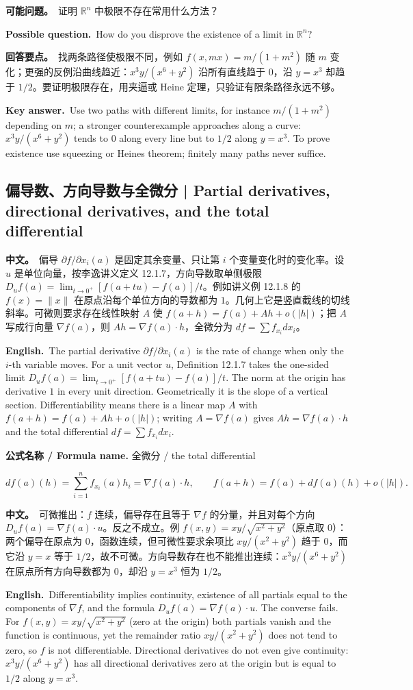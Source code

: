 \documentclass[UTF8,11pt,a4paper]{ctexart}
\newcommand{\BOTH}[2]{\par\noindent\textbf{中文。}\ #1\par\noindent\textbf{English.}\ #2\par}
\newcommand{\FORMULA}[2]{\par\noindent\textbf{公式名称 / Formula name.} #1 / #2\par}
\newcommand{\ASK}[4]{\begin{samepage}\par\noindent\textbf{可能问题。}\ #1\par\noindent\textbf{Possible question.}\ #2\par\noindent\textbf{回答要点。}\ #3\par\noindent\textbf{Key answer.}\ #4\medskip\end{samepage}}
\begin{document}
\ASK{证明 $\mathbb R^n$ 中极限不存在常用什么方法？}{How do you disprove the existence of a limit in $\mathbb R^n$?}{找两条路径使极限不同，例如 $f(x,mx)=m/(1+m^2)$ 随 $m$ 变化；更强的反例沿曲线趋近：$x^3y/(x^6+y^2)$ 沿所有直线趋于 $0$，沿 $y=x^3$ 却趋于 $1/2$。要证明极限存在，用夹逼或 Heine 定理，只验证有限条路径永远不够。}{Use two paths with different limits, for instance $m/(1+m^2)$ depending on $m$; a stronger counterexample approaches along a curve: $x^3y/(x^6+y^2)$ tends to $0$ along every line but to $1/2$ along $y=x^3$. To prove existence use squeezing or Heine\textquotesingle s theorem; finitely many paths never suffice.}

\subsection{偏导数、方向导数与全微分 | Partial derivatives, directional derivatives, and the total differential}
\BOTH{偏导 $\partial f/\partial x_i(a)$ 是固定其余变量、只让第 $i$ 个变量变化时的变化率。设 $u$ 是单位向量，按李逸讲义定义 12.1.7，方向导数取单侧极限 $D_uf(a)=\lim_{t\to0^+}[f(a+tu)-f(a)]/t$。例如讲义例 12.1.8 的 $f(x)=\|x\|$ 在原点沿每个单位方向的导数都为 $1$。几何上它是竖直截线的切线斜率。可微则要求存在线性映射 $A$ 使 $f(a+h)=f(a)+Ah+o(|h|)$；把 $A$ 写成行向量 $\nabla f(a)$，则 $Ah=\nabla f(a)\cdot h$，全微分为 $df=\sum f_{x_i}dx_i$。}{The partial derivative $\partial f/\partial x_i(a)$ is the rate of change when only the $i$-th variable moves. For a unit vector $u$, Definition 12.1.7 takes the one-sided limit $D_uf(a)=\lim_{t\to0^+}[f(a+tu)-f(a)]/t$. The norm at the origin has derivative $1$ in every unit direction. Geometrically it is the slope of a vertical section. Differentiability means there is a linear map $A$ with $f(a+h)=f(a)+Ah+o(|h|)$; writing $A=\nabla f(a)$ gives $Ah=\nabla f(a)\cdot h$ and the total differential $df=\sum f_{x_i}dx_i$.}
\FORMULA{全微分}{the total differential}
\[
df(a)(h)=\sum_{i=1}^{n}f_{x_i}(a)h_i=\nabla f(a)\cdot h,\qquad f(a+h)=f(a)+df(a)(h)+o(|h|).
\]
\BOTH{可微推出：$f$ 连续，偏导存在且等于 $\nabla f$ 的分量，并且对每个方向 $D_uf(a)=\nabla f(a)\cdot u$。反之不成立。例 $f(x,y)=xy/\sqrt{x^2+y^2}$（原点取 $0$）：两个偏导在原点为 $0$，函数连续，但可微性要求余项比 $xy/(x^2+y^2)$ 趋于 $0$，而它沿 $y=x$ 等于 $1/2$，故不可微。方向导数存在也不能推出连续：$x^3y/(x^6+y^2)$ 在原点所有方向导数都为 $0$，却沿 $y=x^3$ 恒为 $1/2$。}{Differentiability implies continuity, existence of all partials equal to the components of $\nabla f$, and the formula $D_uf(a)=\nabla f(a)\cdot u$. The converse fails. For $f(x,y)=xy/\sqrt{x^2+y^2}$ (zero at the origin) both partials vanish and the function is continuous, yet the remainder ratio $xy/(x^2+y^2)$ does not tend to zero, so $f$ is not differentiable. Directional derivatives do not even give continuity: $x^3y/(x^6+y^2)$ has all directional derivatives zero at the origin but is equal to $1/2$ along $y=x^3$.}
\end{document}
